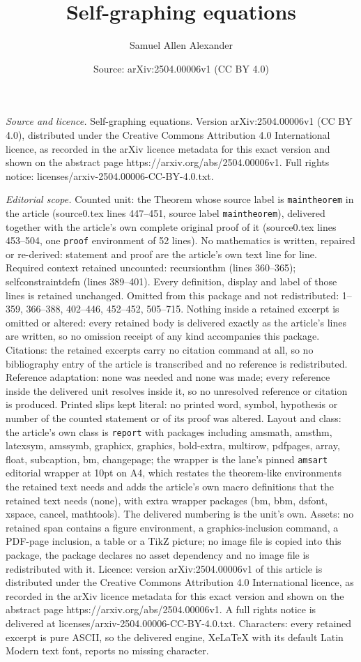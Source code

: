 \documentclass[10pt,a4paper]{amsart}
\title[Self-graphing equations]{Self-graphing equations}
\author{Samuel Allen Alexander}
\date{Source: arXiv:2504.00006v1 (CC BY 4.0)}
\begin{document}
\maketitle

\noindent\emph{Source and licence.} Self-graphing equations. Version arXiv:2504.00006v1 (CC BY 4.0), distributed under the Creative Commons Attribution 4.0 International licence, as recorded in the arXiv licence metadata for this exact version and shown on the abstract page https://arxiv.org/abs/2504.00006v1. Full rights notice: licenses/arxiv-2504.00006-CC-BY-4.0.txt.\par\smallskip

\noindent\textit{Editorial scope.} Counted unit: the Theorem whose source label is \texttt{maintheorem} in the article (source0.tex lines 447--451, source label \texttt{maintheorem}), delivered together with the article's own complete original proof of it (source0.tex lines 453--504, one \texttt{proof} environment of 52 lines). No mathematics is written, repaired or re-derived: statement and proof are the article's own text line for line. Required context retained uncounted: recursionthm (lines 360--365); selfconstraintdefn (lines 389--401). Every definition, display and label of those lines is retained unchanged. Omitted from this package and not redistributed: 1--359, 366--388, 402--446, 452--452, 505--715. Nothing inside a retained excerpt is omitted or altered: every retained body is delivered exactly as the article's lines are written, so no omission receipt of any kind accompanies this package. Citations: the retained excerpts carry no citation command at all, so no bibliography entry of the article is transcribed and no reference is redistributed. Reference adaptation: none was needed and none was made; every reference inside the delivered unit resolves inside it, so no unresolved reference or citation is produced. Printed slips kept literal: no printed word, symbol, hypothesis or number of the counted statement or of its proof was altered. Layout and class: the article's own class is \texttt{report} with packages including amsmath, amsthm, latexsym, amssymb, graphicx, graphics, bold-extra, multirow, pdfpages, array, float, subcaption, bm, changepage; the wrapper is the lane's pinned \texttt{amsart} editorial wrapper at 10pt on A4, which restates the theorem-like environments the retained text needs and adds the article's own macro definitions that the retained text needs (none), with extra wrapper packages (bm, bbm, dsfont, xspace, cancel, mathtools). The delivered numbering is the unit's own. Assets: no retained span contains a figure environment, a graphics-inclusion command, a PDF-page inclusion, a table or a TikZ picture; no image file is copied into this package, the package declares no asset dependency and no image file is redistributed with it. Licence: version arXiv:2504.00006v1 of this article is distributed under the Creative Commons Attribution 4.0 International licence, as recorded in the arXiv licence metadata for this exact version and shown on the abstract page https://arxiv.org/abs/2504.00006v1. A full rights notice is delivered at licenses/arxiv-2504.00006-CC-BY-4.0.txt. Characters: every retained excerpt is pure ASCII, so the delivered engine, XeLaTeX with its default Latin Modern text font, reports no missing character.
\end{document}
